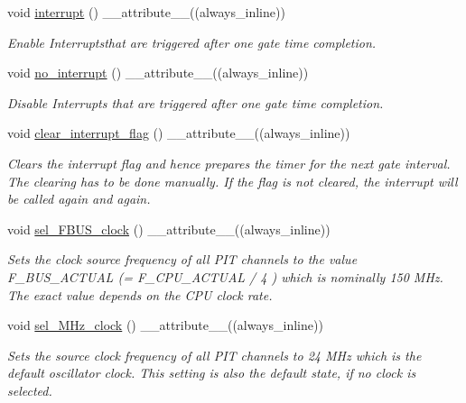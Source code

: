 \begin{DoxyCompactItemize}
void \hyperlink{classPITController_af1a21e0b3f9a57e247aa40c457e15ee3}{interrupt} () \+\_\+\+\_\+attribute\+\_\+\+\_\+((always\+\_\+inline))
\begin{DoxyCompactList}\small\item\em Enable Interruptsthat are triggered after one gate time completion. \end{DoxyCompactList}\item 
void \hyperlink{classPITController_a6e36c84f319e52e5a14ca20f299b64b5}{no\+\_\+interrupt} () \+\_\+\+\_\+attribute\+\_\+\+\_\+((always\+\_\+inline))
\begin{DoxyCompactList}\small\item\em Disable Interrupts that are triggered after one gate time completion. \end{DoxyCompactList}\item 
void \hyperlink{classPITController_ae3f9c981e88cced34153234475de5646}{clear\+\_\+interrupt\+\_\+flag} () \+\_\+\+\_\+attribute\+\_\+\+\_\+((always\+\_\+inline))
\begin{DoxyCompactList}\small\item\em Clears the interrupt flag and hence prepares the timer for the next gate interval. The clearing has to be done manually. If the flag is not cleared, the interrupt will be called again and again. \end{DoxyCompactList}\item 
void \hyperlink{classPITController_a63e67e2ebfd6ceb5f5e38d9bd6a54754}{sel\+\_\+\+F\+B\+U\+S\+\_\+clock} () \+\_\+\+\_\+attribute\+\_\+\+\_\+((always\+\_\+inline))
\begin{DoxyCompactList}\small\item\em Sets the clock source frequency of all P\+IT channels to the value F\+\_\+\+B\+U\+S\+\_\+\+A\+C\+T\+U\+AL (= F\+\_\+\+C\+P\+U\+\_\+\+A\+C\+T\+U\+AL / 4 ) which is nominally 150 M\+Hz. The exact value depends on the C\+PU clock rate. \end{DoxyCompactList}\item 
void \hyperlink{classPITController_adb0d04fa23f4ebd20d2f495a86af3ccd}{sel\+\_\+M\+Hz\+\_\+clock} () \+\_\+\+\_\+attribute\+\_\+\+\_\+((always\+\_\+inline))
\begin{DoxyCompactList}\small\item\em Sets the source clock frequency of all P\+IT channels to 24 M\+Hz which is the default oscillator clock. This setting is also the default state, if no clock is selected. \end{DoxyCompactList}\end{DoxyCompactItemize}
